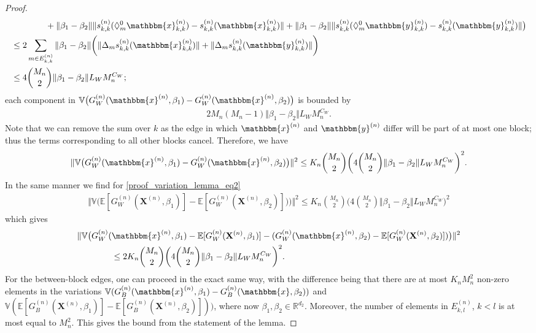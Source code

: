 \documentclass{article}
\begin{document}
\begin{proof}
\begin{align*}
         & \qquad \qquad +  \Vert \beta_1 - \beta_2 \Vert \Vert   s_{k,k}^{(n)}(\Diamond_m^0\mathbbm{x}_{k,k}^{(n)}) - s_{k,k}^{(n)}(\mathbbm{x}_{k,k}^{(n)}) \Vert + \Vert \beta_1 - \beta_2 \Vert \Vert   s_{k,k}^{(n)}(\Diamond_m^0\mathbbm{y}_{k,k}^{(n)}) - s_{k,k}^{(n)}(\mathbbm{y}_{k,k}^{(n)}) \Vert \big) \\
         & \leq  2 \sum_{m \in E_{k,k}^{(n)}}  \Vert \beta_1 - \beta_2 \Vert \bigg( \Vert  \Delta_m s_{k,k}^{(n)}(\mathbbm{x}_{k,k}^{(n)}) \Vert + \Vert  \Delta_m s_{k,k}^{(n)}(\mathbbm{y}_{k,k}^{(n)}) \Vert \bigg) \\
         & \leq 4 \binom{M_n}{2} \Vert \beta_1 - \beta_2 \Vert L_W M_n^{C_W};
    \end{align*}
    each component in $\mathbb{V}\big(G_W^{(n)}(\mathbbm{x}^{(n)},\beta_1) - G_W^{(n)}(\mathbbm{x}^{(n)},\beta_2) \big)$ is bounded by 
    \begin{align*}
        2 M_n (M_n-1) \Vert \beta_1 - \beta_2 \Vert L_W M_n^{C_W}.
    \end{align*}
    Note that we can remove the sum over $k$ as the edge in which $\mathbbm{x}^{(n)}$ and $\mathbbm{y}^{(n)}$ differ  will be part of at most one block; thus the terms corresponding to all other blocks  cancel. Therefore, we have
    \begin{align*}
        \Vert \mathbb{V}\big(G_W^{(n)}(\mathbbm{x}^{(n)},\beta_1) - G_W^{(n)}(\mathbbm{x}^{(n)},\beta_2) \big) \Vert^2 \leq K_n\binom{M_n}{2} \bigg( 4 \binom{M_n}{2} \Vert \beta_1 - \beta_2 \Vert L_W M_n^{C_W}  \bigg)^2.
    \end{align*}
    In the  same manner we find for \eqref{proof_variation_lemma_eq2}
    \begin{align*}
        \Vert \mathbb{V}\big( \mathbb{E}[G_W^{(n)}(\mathbf{X}^{(n)},\beta_1)]  - \mathbb{E}[G_W^{(n)}(\mathbf{X}^{(n)},\beta_2)]) \big) \Vert^2 \leq K_n\binom{M_n}{2} \bigg( 4 \binom{M_n}{2} \Vert \beta_1 - \beta_2 \Vert L_W M_n^{C_W}  \bigg)^2
    \end{align*}
    which gives
    \begin{align*}
        & \Vert \mathbb{V}\big(G_W^{(n)}(\mathbbm{x}^{(n)},\beta_1) - \mathbb{E}[G_W^{(n)}(\mathbf{X}^{(n)},\beta_1)] - (G_W^{(n)}(\mathbbm{x}^{(n)},\beta_2) - \mathbb{E}[G_W^{(n)}(\mathbf{X}^{(n)},\beta_2)]) \big) \Vert^2 \\
         & \qquad \qquad \leq 2K_n\binom{M_n}{2} \bigg( 4 \binom{M_n}{2} \Vert \beta_1 - \beta_2 \Vert L_W M_n^{C_W}  \bigg)^2 . 
    \end{align*}
    For the between-block edges, one can proceed in the exact same way,  with the difference being that there are at most $K_nM_n^2$ non-zero elements in the variations $\mathbb{V}(G_B^{(n)}(\mathbbm{x}^{(n)},\beta_1) - G_B^{(n)}(\mathbbm{x},\beta_2) ) $ and $ \mathbb{V}( \mathbb{E}[G_B^{(n)}(\mathbf{X}^{(n)},\beta_1)]  - \mathbb{E}[G_B^{(n)}(\mathbf{X}^{(n)},\beta_2)]) ) $, where now $\beta_1, \beta_2 \in \mathbb{R}^{d_2}$. Moreover, the number of elements in $E_{k,l}^{(n)}$, $k<l$ is at most equal to $M_n^2$. This gives the bound from the statement of the lemma.
\end{proof}
\end{document}
